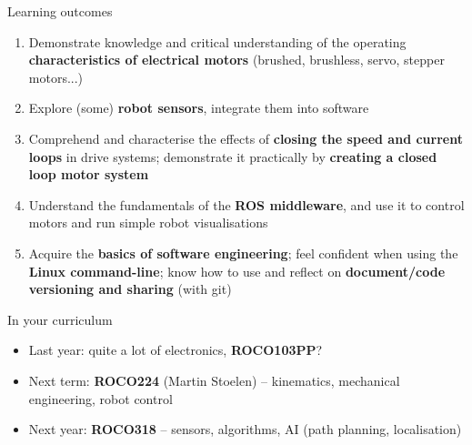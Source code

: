 \documentclass[compress]{beamer}
\begin{document}
\begin{frame}{Learning outcomes}
    \begin{enumerate}
        \item<+-> Demonstrate knowledge and critical understanding of the operating
            \textbf{characteristics of electrical motors} (brushed, brushless,
            servo, stepper motors...)
        \item<+-> Explore (some) \textbf{robot sensors}, integrate them into software
        \item<+-> Comprehend and characterise the effects of \textbf{closing the speed and current
            loops} in drive systems; demonstrate it practically by \textbf{creating a
            closed loop motor system}
        \item<+-> Understand the fundamentals of the \textbf{ROS middleware},
            and use it to control motors and run simple robot visualisations
        \item<+-> Acquire the \textbf{basics of software engineering}; feel
            confident when using the \textbf{Linux command-line}; know how to
            use and reflect on \textbf{document/code versioning and sharing}
            (with git)

    \end{enumerate}
\end{frame}

\begin{frame}{In your curriculum}
    \begin{itemize}
        \item Last year: quite a lot of electronics, \textbf{ROCO103PP}?
        \item Next term: \textbf{ROCO224} (Martin Stoelen) -- kinematics, mechanical engineering,
            robot control
        \item Next year: \textbf{ROCO318} -- sensors, algorithms, AI (path
            planning, localisation)
    \end{itemize}
\end{frame}
\end{document}
